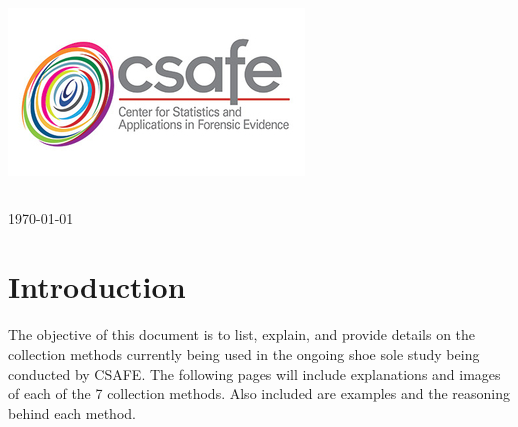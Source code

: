 \begin{titlepage}

\includegraphics[scale=.5]{Logo}\\[1cm]

\begin{center}
\begin{tabular}{ c   |   c } 
 
\end{tabular}
\end{center}

{\large \today}\\[2cm] %


 

\vfill %

\end{titlepage}
 
\tableofcontents

\newpage

\section{Introduction}

The objective of this document is to list, explain, and provide details on the collection methods currently being used in the ongoing shoe sole study being conducted by CSAFE. The following pages will include explanations and images of each of the 7 collection methods. Also included are examples and the reasoning behind each method.  

